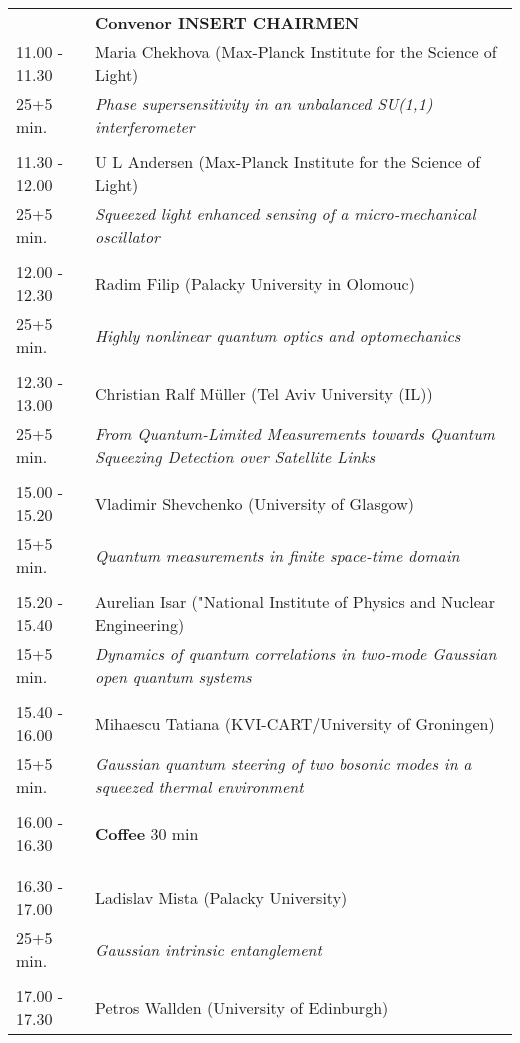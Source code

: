 \begin{longtable}{p{3cm}p{13cm}}
&\hfill {\bf Convenor INSERT CHAIRMEN }\\ 
11.00 - 11.30 & Maria Chekhova (Max-Planck Institute for the Science of Light)\\ 
25+5 min. & {\it Phase supersensitivity in an unbalanced SU(1,1) interferometer}\\ 
 & \\ 
11.30 - 12.00 & U L Andersen (Max-Planck Institute for the Science of Light)\\ 
25+5 min. & {\it Squeezed light enhanced sensing of a micro-mechanical oscillator}\\ 
 & \\ 
12.00 - 12.30 & Radim Filip (Palacky University in Olomouc)\\ 
25+5 min. & {\it Highly nonlinear quantum optics and optomechanics}\\ 
 & \\ 
12.30 - 13.00 & Christian Ralf Müller (Tel Aviv University (IL))\\ 
25+5 min. & {\it From Quantum-Limited Measurements towards Quantum Squeezing Detection over Satellite Links}\\ 
 & \\ 
15.00 - 15.20 & Vladimir Shevchenko (University of Glasgow)\\ 
15+5 min. & {\it Quantum measurements in finite space-time domain}\\ 
 & \\ 
15.20 - 15.40 & Aurelian Isar ("National Institute of Physics and Nuclear Engineering)\\ 
15+5 min. & {\it Dynamics of quantum correlations in two-mode Gaussian open quantum systems}\\ 
 & \\ 
15.40 - 16.00 & Mihaescu Tatiana (KVI-CART/University of Groningen)\\ 
15+5 min. & {\it Gaussian quantum steering of two bosonic modes in a squeezed thermal environment}\\ 
 & \\ 
16.00 - 16.30 & {\bf Coffee} \hfill 30 min \\ 
 & \\ 
 & \\ 
16.30 - 17.00 & Ladislav Mista (Palacky University)\\ 
25+5 min. & {\it Gaussian intrinsic entanglement}\\ 
 & \\ 
17.00 - 17.30 & Petros Wallden (University of Edinburgh)\\ 

\end{longtable}
